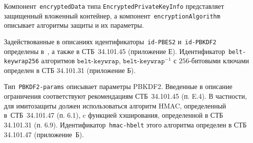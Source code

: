 Компонент~\texttt{encryptedData} типа \texttt{EncryptedPrivateKeyInfo}
представляет защищенный вложенный контейнер, 
а компонент~\texttt{encryptionAlgorithm} описывает
алгоритмы защиты и их параметры. 

Задействованные в описаниях идентификаторы~\texttt{id-PBES2} 
и~\texttt{id-PBKDF2} определены в~\cite{PKCS5}, а также в СТБ~34.101.45 
(приложение Е).  
%
Идентификатор~\texttt{belt-keywrap256} алгоритмов 
$\texttt{belt-keywrap}$, $\texttt{belt-keywrap}^{-1}$
с $256$-битовыми ключами определен в СТБ 34.101.31 (приложение Б).

Тип~\texttt{PBKDF2-params} описывает параметры PBKDF2.
Введенные в описание ограничения соответствуют 
рекомендациям СТБ~34.101.45 (п. E.4).
%
В частности, для имитозащиты должен использоваться алгоритм HMAC, 
определенный в~СТБ~34.101.47 (п. 6.1), c функцией хэширования, 
определенной в СТБ 34.101.31 (п. 6.9). 
Идентификатор~\texttt{hmac-hbelt} этого алгоритма 
определен в СТБ 34.101.47 (приложение~Б).

